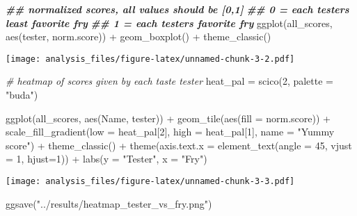 \documentclass[
]{article}
\newenvironment{Shaded}{\begin{snugshade}}{\end{snugshade}}
\newcommand{\AttributeTok}[1]{\textcolor[rgb]{0.77,0.63,0.00}{#1}}
\newcommand{\CommentTok}[1]{\textcolor[rgb]{0.56,0.35,0.01}{\textit{#1}}}
\newcommand{\DecValTok}[1]{\textcolor[rgb]{0.00,0.00,0.81}{#1}}
\newcommand{\DocumentationTok}[1]{\textcolor[rgb]{0.56,0.35,0.01}{\textbf{\textit{#1}}}}
\newcommand{\FunctionTok}[1]{\textcolor[rgb]{0.00,0.00,0.00}{#1}}
\newcommand{\NormalTok}[1]{#1}
\newcommand{\OtherTok}[1]{\textcolor[rgb]{0.56,0.35,0.01}{#1}}
\newcommand{\SpecialCharTok}[1]{\textcolor[rgb]{0.00,0.00,0.00}{#1}}
\newcommand{\StringTok}[1]{\textcolor[rgb]{0.31,0.60,0.02}{#1}}
\begin{document}
\begin{Shaded}
\begin{Highlighting}[]
\DocumentationTok{\#\# normalized scores, all values should be [0,1]}
\DocumentationTok{\#\# 0 = each tester\textquotesingle{}s least favorite fry}
\DocumentationTok{\#\# 1 = each tester\textquotesingle{}s favorite fry}
\FunctionTok{ggplot}\NormalTok{(all\_scores, }\FunctionTok{aes}\NormalTok{(tester, norm.score)) }\SpecialCharTok{+}
  \FunctionTok{geom\_boxplot}\NormalTok{() }\SpecialCharTok{+}
  \FunctionTok{theme\_classic}\NormalTok{()}
\end{Highlighting}
\end{Shaded}

\texttt{[image: analysis\_files/figure-latex/unnamed-chunk-3-2.pdf]}

\begin{Shaded}
\begin{Highlighting}[]
\CommentTok{\# heatmap of scores given by each taste tester}
\NormalTok{heat\_pal }\OtherTok{=} \FunctionTok{scico}\NormalTok{(}\DecValTok{2}\NormalTok{, }\AttributeTok{palette =} \StringTok{"buda"}\NormalTok{)}

\FunctionTok{ggplot}\NormalTok{(all\_scores, }\FunctionTok{aes}\NormalTok{(Name, tester)) }\SpecialCharTok{+}
  \FunctionTok{geom\_tile}\NormalTok{(}\FunctionTok{aes}\NormalTok{(}\AttributeTok{fill =}\NormalTok{ norm.score)) }\SpecialCharTok{+}
  \FunctionTok{scale\_fill\_gradient}\NormalTok{(}\AttributeTok{low =}\NormalTok{ heat\_pal[}\DecValTok{2}\NormalTok{], }\AttributeTok{high =}\NormalTok{ heat\_pal[}\DecValTok{1}\NormalTok{], }\AttributeTok{name =} \StringTok{"Yummy score"}\NormalTok{) }\SpecialCharTok{+}
  \FunctionTok{theme\_classic}\NormalTok{() }\SpecialCharTok{+}
  \FunctionTok{theme}\NormalTok{(}\AttributeTok{axis.text.x =} \FunctionTok{element\_text}\NormalTok{(}\AttributeTok{angle =} \DecValTok{45}\NormalTok{, }\AttributeTok{vjust =} \DecValTok{1}\NormalTok{, }\AttributeTok{hjust=}\DecValTok{1}\NormalTok{)) }\SpecialCharTok{+}
  \FunctionTok{labs}\NormalTok{(}\AttributeTok{y =} \StringTok{"Tester"}\NormalTok{, }\AttributeTok{x =} \StringTok{"Fry"}\NormalTok{)}
\end{Highlighting}
\end{Shaded}

\texttt{[image: analysis\_files/figure-latex/unnamed-chunk-3-3.pdf]}

\begin{Shaded}
\begin{Highlighting}[]
\FunctionTok{ggsave}\NormalTok{(}\StringTok{"../results/heatmap\_tester\_vs\_fry.png"}\NormalTok{)}
\end{Highlighting}
\end{Shaded}
\end{document}
